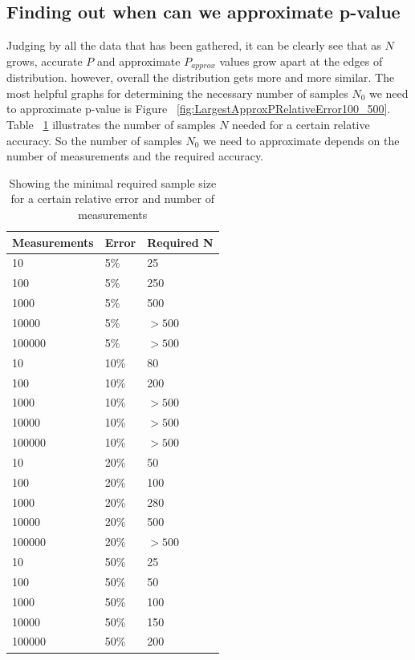 \documentclass[12pt]{article}
\begin{document}
{\subsection{Finding out when can we approximate p-value}
Judging by all the data that has been gathered, it can be clearly see that as $N$ grows, accurate $P$ and approximate $P_{approx}$ values grow apart at the edges of distribution. however, overall the distribution gets more and more similar. The most helpful graphs for determining the necessary number of samples $N_0$ we need to approximate p-value is Figure ~\ref{fig:LargestApproxPRelativeError100_500}. Table ~\ref{table:requiredN} illustrates the number of samples $N$ needed for a certain relative accuracy. So the number of samples $N_0$ we need to approximate depends on the number of measurements and the required accuracy.

\begin{table}[H]
	\begin{center}
		\caption{Showing the minimal required sample size for a certain relative error and number of measurements}
	    \begin{tabular}{| l | l | l |}
	    \hline
		Measurements & Error & Required N \\
		\hline
		10 & 5\% & 25 \\
    \hline
		100 & 5\% & 250 \\
    \hline
		1000 & 5\% & 500 \\
    \hline
		10000 & 5\% & $>500$ \\
    \hline
		100000 & 5\% & $> 500$ \\
    \hline
		\hline
		10  & 10\% & 80 \\
    \hline
		100 & 10\% & 200 \\
    \hline
		1000 & 10\% & $>500$ \\
    \hline
		10000 & 10\% & $>500$ \\
    \hline
		100000  & 10\% & $>500$ \\
		\hline
    \hline
		10  & 20\% & 50 \\
    \hline
		100 & 20\% & 100 \\
    \hline
		1000  & 20\% & 280 \\
    \hline
		10000  & 20\% & 500 \\
    \hline
		100000  & 20\% & $>500$ \\
    \hline
    \hline
		10  & 50\% &  25 \\
    \hline
		100 & 50\% & 50 \\
    \hline
		1000 & 50\% & 100 \\
    \hline
		10000 & 50\% & 150 \\
    \hline
		100000 & 50\% & 200 \\
		\hline
		\end{tabular}
		\label{table:requiredN}
	\end{center}
\end{table}

}
\end{document}
